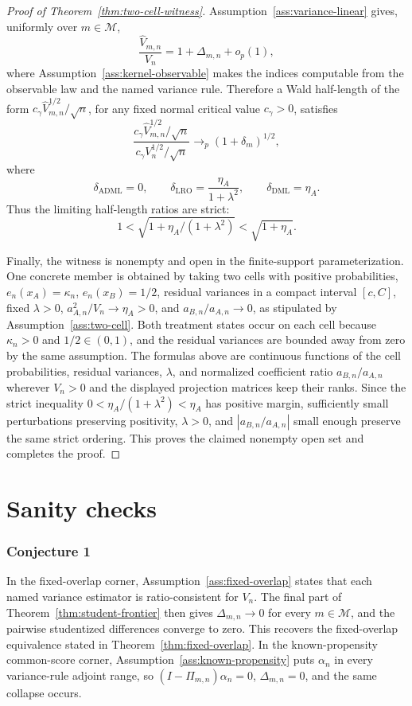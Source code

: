 \documentclass[11pt]{article}
\theoremstyle{definition}
\theoremstyle{plain}
\theoremstyle{remark}
\begin{document}
\begin{proof}[Proof of Theorem~\ref{thm:two-cell-witness}]
Assumption~\ref{ass:variance-linear} gives, uniformly over \(m\in\mathcal M\),
\[
  \frac{\hat V_{m,n}}{V_n}=1+\Delta_{m,n}+o_p(1),
\]
where Assumption~\ref{ass:kernel-observable} makes the indices computable from the observable law and the named variance rule.  Therefore a Wald half-length of the form \(c_\gamma\hat V_{m,n}^{1/2}/\sqrt n\), for any fixed normal critical value \(c_\gamma>0\), satisfies
\[
  \frac{c_\gamma\hat V_{m,n}^{1/2}/\sqrt n}{c_\gamma V_n^{1/2}/\sqrt n}
  \to_p
  (1+\delta_m)^{1/2},
\]
where
\[
  \delta_{\mathrm{ADML}}=0,\qquad
  \delta_{\mathrm{LRO}}=\frac{\eta_A}{1+\lambda^2},\qquad
  \delta_{\mathrm{DML}}=\eta_A.
\]
Thus the limiting half-length ratios are strict:
\[
  1
  <
  \sqrt{1+\eta_A/(1+\lambda^2)}
  <
  \sqrt{1+\eta_A}.
\]

Finally, the witness is nonempty and open in the finite-support parameterization.  One concrete member is obtained by taking two cells with positive probabilities, \(e_n(x_A)=\kappa_n\), \(e_n(x_B)=1/2\), residual variances in a compact interval \([c,C]\), fixed \(\lambda>0\), \(a_{A,n}^2/V_n\to\eta_A>0\), and \(a_{B,n}/a_{A,n}\to0\), as stipulated by Assumption~\ref{ass:two-cell}.  Both treatment states occur on each cell because \(\kappa_n>0\) and \(1/2\in(0,1)\), and the residual variances are bounded away from zero by the same assumption.  The formulas above are continuous functions of the cell probabilities, residual variances, \(\lambda\), and normalized coefficient ratio \(a_{B,n}/a_{A,n}\) wherever \(V_n>0\) and the displayed projection matrices keep their ranks.  Since the strict inequality \(0<\eta_A/(1+\lambda^2)<\eta_A\) has positive margin, sufficiently small perturbations preserving positivity, \(\lambda>0\), and \(|a_{B,n}/a_{A,n}|\) small enough preserve the same strict ordering.  This proves the claimed nonempty open set and completes the proof.
\end{proof}

\section{Sanity checks}
\subsubsection*{Conjecture 1}
In the fixed-overlap corner, Assumption~\ref{ass:fixed-overlap} states that
each named variance estimator is ratio-consistent for \(V_n\).  The final part
of Theorem~\ref{thm:student-frontier} then gives
\(\Delta_{m,n}\to0\) for every \(m\in\mathcal M\), and the pairwise
studentized differences converge to zero.  This recovers the fixed-overlap
equivalence stated in Theorem~\ref{thm:fixed-overlap}.  In the known-propensity
common-score corner, Assumption~\ref{ass:known-propensity} puts
\(\alpha_n\) in every variance-rule adjoint range, so
\((I-\Pi_{m,n})\alpha_n=0\), \(\Delta_{m,n}=0\), and the same collapse occurs.
\end{document}
